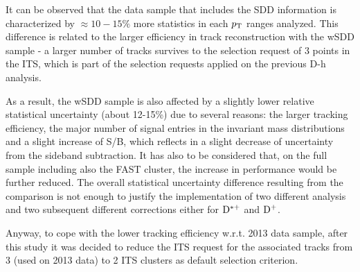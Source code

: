 It can be observed that the data sample that includes the SDD information is characterized by $\approx 10-15\%$ more statistics in each $p_{\rm T}$ ranges analyzed. This difference is related to the larger efficiency in track reconstruction with the wSDD sample - a larger number of tracks survives to the selection request of 3 points in the ITS, which is part of the selection requests applied on the previous D-h analysis.

As a result, the wSDD sample is also affected by a slightly lower relative statistical uncertainty (about 12-15\%) due to several reasons: the larger tracking efficiency, the major number of signal entries in the invariant mass distributions and a slight increase of S/B, which reflects in a slight decrease of uncertainty from the sideband subtraction.
It has also to be considered that, on the full sample including also the FAST cluster, the increase in performance would be further reduced.
The overall statistical uncertainty difference resulting from the comparison is not enough to justify the implementation of two different analysis and two subsequent different corrections either for ${\rm D^{*+}}$ and ${\rm D^+}$.

Anyway, to cope with the lower tracking efficiency w.r.t. 2013 data sample, after this study it was decided to reduce the ITS request for the associated tracks from 3 (used on 2013 data) to 2 ITS clusters as default selection criterion.


